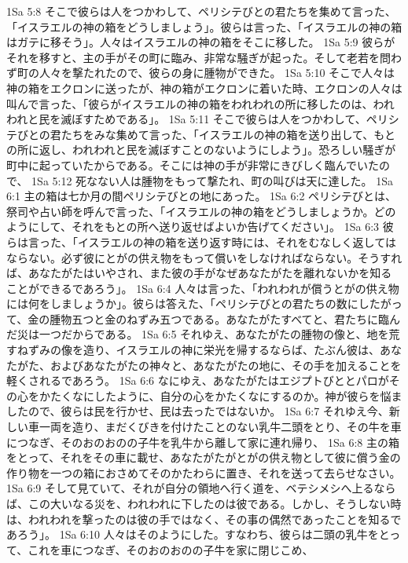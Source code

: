 1Sa 5:8  そこで彼らは人をつかわして、ペリシテびとの君たちを集めて言った、「イスラエルの神の箱をどうしましょう」。彼らは言った、「イスラエルの神の箱はガテに移そう」。人々はイスラエルの神の箱をそこに移した。
1Sa 5:9  彼らがそれを移すと、主の手がその町に臨み、非常な騒ぎが起った。そして老若を問わず町の人々を撃たれたので、彼らの身に腫物ができた。
1Sa 5:10  そこで人々は神の箱をエクロンに送ったが、神の箱がエクロンに着いた時、エクロンの人々は叫んで言った、「彼らがイスラエルの神の箱をわれわれの所に移したのは、われわれと民を滅ぼすためである」。
1Sa 5:11  そこで彼らは人をつかわして、ペリシテびとの君たちをみな集めて言った、「イスラエルの神の箱を送り出して、もとの所に返し、われわれと民を滅ぼすことのないようにしよう」。恐ろしい騒ぎが町中に起っていたからである。そこには神の手が非常にきびしく臨んでいたので、
1Sa 5:12  死なない人は腫物をもって撃たれ、町の叫びは天に達した。
1Sa 6:1  主の箱は七か月の間ペリシテびとの地にあった。
1Sa 6:2  ペリシテびとは、祭司や占い師を呼んで言った、「イスラエルの神の箱をどうしましょうか。どのようにして、それをもとの所へ送り返せばよいか告げてください」。
1Sa 6:3  彼らは言った、「イスラエルの神の箱を送り返す時には、それをむなしく返してはならない。必ず彼にとがの供え物をもって償いをしなければならない。そうすれば、あなたがたはいやされ、また彼の手がなぜあなたがたを離れないかを知ることができるであろう」。
1Sa 6:4  人々は言った、「われわれが償うとがの供え物には何をしましょうか」。彼らは答えた、「ペリシテびとの君たちの数にしたがって、金の腫物五つと金のねずみ五つである。あなたがたすべてと、君たちに臨んだ災は一つだからである。
1Sa 6:5  それゆえ、あなたがたの腫物の像と、地を荒すねずみの像を造り、イスラエルの神に栄光を帰するならば、たぶん彼は、あなたがた、およびあなたがたの神々と、あなたがたの地に、その手を加えることを軽くされるであろう。
1Sa 6:6  なにゆえ、あなたがたはエジプトびととパロがその心をかたくなにしたように、自分の心をかたくなにするのか。神が彼らを悩ましたので、彼らは民を行かせ、民は去ったではないか。
1Sa 6:7  それゆえ今、新しい車一両を造り、まだくびきを付けたことのない乳牛二頭をとり、その牛を車につなぎ、そのおのおのの子牛を乳牛から離して家に連れ帰り、
1Sa 6:8  主の箱をとって、それをその車に載せ、あなたがたがとがの供え物として彼に償う金の作り物を一つの箱におさめてそのかたわらに置き、それを送って去らせなさい。
1Sa 6:9  そして見ていて、それが自分の領地へ行く道を、ベテシメシへ上るならば、この大いなる災を、われわれに下したのは彼である。しかし、そうしない時は、われわれを撃ったのは彼の手ではなく、その事の偶然であったことを知るであろう」。
1Sa 6:10  人々はそのようにした。すなわち、彼らは二頭の乳牛をとって、これを車につなぎ、そのおのおのの子牛を家に閉じこめ、
